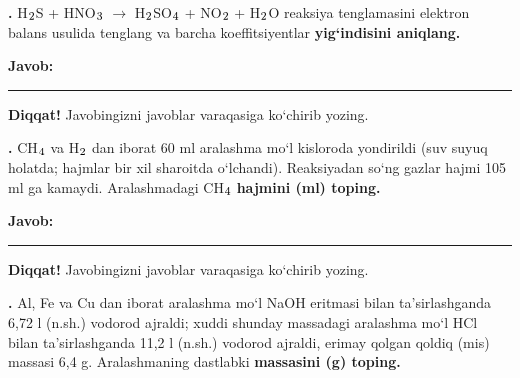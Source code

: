 \documentclass[11pt,a4paper]{article}
\renewcommand{\textsubscript}[1]{\ensuremath{_{\text{\fontsize{8}{8}\selectfont #1}}}}
\newcommand{\qn}[1]{\textbf{\fontsize{11.5}{13}\selectfont #1}}
\newcommand{\qsep}{\par\vspace{1pt}\noindent\rule{0pt}{0.4pt}\par\vspace{5pt}}
\newcommand{\javob}{\par\smallskip\noindent\textbf{Javob:} \rule[-2pt]{7.5cm}{0.4pt}\par\smallskip\noindent\textbf{Diqqat!} Javobingizni javoblar varaqasiga ko`chirib yozing.\par\medskip}
\begin{document}
\noindent\setlength{\fboxsep}{0pt}
\par\bigskip
\noindent\qn{36.} H\textsubscript{2}S + HNO\textsubscript{3} $\to$ H\textsubscript{2}SO\textsubscript{4} + NO\textsubscript{2} + H\textsubscript{2}O reaksiya tenglamasini elektron balans usulida tenglang va barcha koeffitsiyentlar \textbf{yig`indisini aniqlang.}
\javob\qsep
\noindent\qn{37.} CH\textsubscript{4} va H\textsubscript{2} dan iborat 60 ml aralashma mo`l kisloroda yondirildi (suv suyuq holatda; hajmlar bir xil sharoitda o`lchandi). Reaksiyadan so`ng gazlar hajmi 105 ml ga kamaydi. Aralashmadagi CH\textsubscript{4} \textbf{hajmini (ml) toping.}
\javob\qsep
\noindent\qn{38.} Al, Fe va Cu dan iborat aralashma mo`l NaOH eritmasi bilan ta'sirlashganda 6,72 l (n.sh.) vodorod ajraldi; xuddi shunday massadagi aralashma mo`l HCl bilan ta'sirlashganda 11,2 l (n.sh.) vodorod ajraldi, erimay qolgan qoldiq (mis) massasi 6,4 g. Aralashmaning dastlabki \textbf{massasini (g) toping.}
\end{document}
